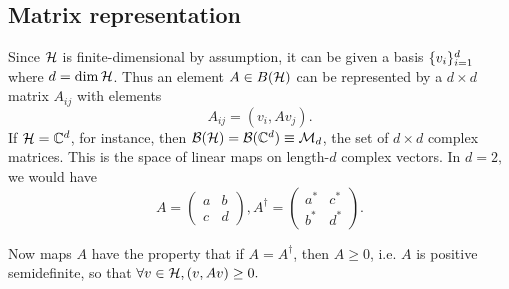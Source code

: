 \subsection*{Matrix representation} Since $\mathcal H$ is finite-dimensional by assumption, it can be given a basis $\{v_i\}^d_{i=1}$ where $d=\dim \mathcal H$. Thus an element $A\in B(\mathcal H)$ can be represented by a $d\times d$ matrix $A_{ij}$ with elements
\begin{equation}
    A_{ij}=(v_i,A v_j).
\end{equation}
If $\mathcal H=\mathbb{C}^d$, for instance, then $\mathcal{B}(\mathcal H)=\mathcal{B}(\mathbb{C}^d) \equiv \mathcal{M}_d$, the set of $d\times d$ complex matrices. This is the space of linear maps on length-$d$ complex vectors. In $d=2,$ we would have
\begin{equation}
    A=\begin{pmatrix}
        a & b\\
        c & d
    \end{pmatrix}, A^\dagger = \begin{pmatrix}
        a^* & c^* \\
        b^* & d^*
    \end{pmatrix}.
\end{equation}

Now maps $A$ have the property that if $A=A^\dagger$, then $A\geq 0$, i.e. $A$ is positive semidefinite, so that $\forall v\in \mathcal H, (v,Av)\geq 0.$ %
